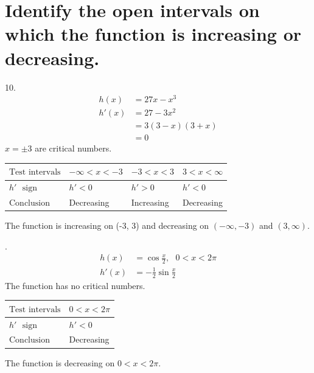 \documentclass[11pt]{article}
\newcommand*{\vs}{\vspace{1cm}}
\newcommand*{\next}{\noindent}
\begin{document}
\section{Identify the open intervals on which the function is increasing or decreasing.}
10.\begin{align}
    h(x)&=27x-x^3\\
    h'(x)&=27-3x^2\\
    &=3(3-x)(3+x)\\
    &=0
\end{align}
$x=\pm 3$ are critical numbers.

\begin{flushleft}
    \begin{table}[h]
        \begin{tabular}{|l|l|l|l|} %
        \hline
        $\text{Test intervals}$ & $-\infty<x<-3$ & $-3<x<3$ & $3<x<\infty$\\ \hline
        $h'\,\,\,\,\text{sign}$ & $h'<0$ & $h'>0$ & $h'<0$\\ \hline
        $\text{Conclusion}$ & Decreasing & Increasing & Decreasing\\
        \hline
        \end{tabular}
    \end{table}
\end{flushleft}

The function is increasing on (-3, 3) and decreasing on $(-\infty, -3)$ and $(3, \infty)$.

\vs
\next
14.\begin{align}
    h(x)&=\cos\frac{x}{2},\,\,\,\,0<x<2\pi\\
    h'(x)&=-\frac{1}{2}\sin\frac{x}{2}
\end{align}
The function has no critical numbers.
\begin{flushleft}
    \begin{table}[h]
        \begin{tabular}{|l|l|} %
        \hline
        $\text{Test intervals}$ & $0<x<2\pi$\\ \hline
        $h'\,\,\,\,\text{sign}$ & $h'<0$\\ \hline
        $\text{Conclusion}$ & Decreasing\\
        \hline
        \end{tabular}
    \end{table}
\end{flushleft}
The function is decreasing on $0<x<2\pi$.
\end{document}
